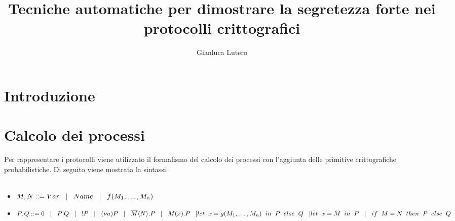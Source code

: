 \documentclass[12pt]{report}
\title{Tecniche automatiche per dimostrare la segretezza forte nei protocolli crittografici}
\author{Gianluca Lutero}
\begin{document}
\maketitle
\newpage

\newpage
{}
\section*{Introduzione}
\section*{Calcolo dei processi}
Per rappresentare i protocolli viene utilizzato il formalismo del calcolo dei processi con l'aggiunta delle primitive crittografiche probabilistiche. Di seguito viene mostrata la sintassi:\\
\\
\begin{itemize}
    \item $M, N ::= Var \hspace{3mm}|\hspace{3mm} Name \hspace{3mm}|\hspace{3mm} f(M_1, \dots ,M_n)$
    
    \item $P,Q ::= 0 \hspace{3mm}|\hspace{3mm} P|Q \hspace{3mm}|\hspace{3mm} !P \hspace{3mm}|\hspace{3mm} (\nu a)P \hspace{3mm}|\hspace{3mm} \overline{M} \langle N \rangle .P \hspace{3mm}|\hspace{3mm} M(x).P \hspace{3mm}|\hspace{3mm}\\let\hspace{2mm}x = g(M_1, \dots,M_n)\hspace{2mm} in\hspace{2mm}P\hspace{2mm} else\hspace{2mm} Q \hspace{3mm}| \\ let \hspace{2mm}x=M\hspace{2mm}in\hspace{2mm}P\hspace{3mm}|\hspace{3mm}if\hspace{2mm}M=N\hspace{2mm}then\hspace{2mm}P\hspace{2mm}else\hspace{2mm}Q$
\end{itemize}
\end{document}
